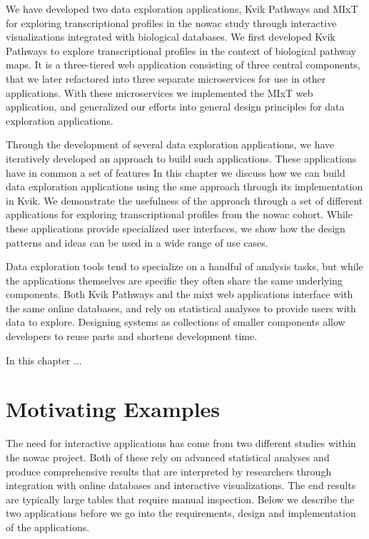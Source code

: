 We have developed two data exploration applications, Kvik
Pathways\cite{fjukstad2015kvik} and
MIxT\cite{fjukstad2017building,dumeaux2017interactions} for exploring
transcriptional profiles in the \gls{nowac} study through interactive
visualizations integrated with biological databases. We first developed Kvik
Pathways to explore transcriptional profiles in the context of biological
pathway maps. It is a three-tiered web application consisting of three central
components, that we later refactored into three separate microservices for use
in other applications. With these microservices we implemented the MIxT web
application, and generalized our efforts into general design principles for data
exploration applications.

Through the development of several data exploration applications, we have
iteratively developed an approach to build such applications. These applications
have in common a set of features In this chapter we discuss how we can build
data exploration applications using the \gls{sme} approach through its
implementation in Kvik. We demonstrate the usefulness of the approach through a
set of different applications for exploring transcriptional profiles from the
\gls{nowac} cohort. While these applications provide specialized user
interfaces, we show how the design patterns and ideas can be used in a wide
range of use cases. 

Data exploration tools tend to specialize on a handful of analysis tasks, but
while the applications themselves are specific they often share the same
underlying components. Both Kvik Pathways and the \gls{mixt} web
applications interface with the same online databases, and rely on statistical
analyses to provide users with data to explore. Designing systems as collections
of smaller components allow developers to reuse parts and shortens development
time. 

In this chapter ... 

\section{Motivating Examples}
The need for interactive applications has come from two different studies
within the \gls{nowac} project. Both of these rely on advanced statistical
analyses and produce comprehensive results that are interpreted by researchers
through integration with online databases and interactive visualizations. The
end results are typically large tables that require manual inspection. Below we
describe the two applications before we go into the requirements, design and
implementation of the applications. 

